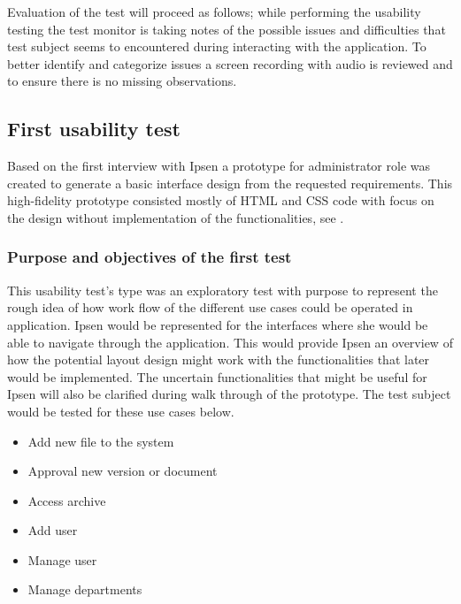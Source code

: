 Evaluation of the test will proceed as follows; while performing the usability testing the test monitor is taking notes of the possible issues and difficulties that test subject seems to encountered during interacting with the application. 
To better identify and categorize issues a screen recording with audio is reviewed and to ensure there is no missing observations.

\subsection{First usability test}\label{firsttest}
Based on the first interview with Ipsen a prototype for administrator role was created to generate a basic interface design from the requested requirements. 
This high-fidelity prototype consisted mostly of HTML and CSS code with focus on the design without implementation of the functionalities, see .

\subsubsection*{Purpose and objectives of the first test}
This usability test's type was an exploratory test with purpose to represent the rough idea of how work flow of the different use cases could be operated in application. 
Ipsen would be represented for the interfaces where she would be able to navigate through the application.
This would provide Ipsen an overview of how the potential layout design might work with the functionalities that later would be implemented. 
The uncertain functionalities that might be useful for Ipsen will also be clarified during walk through of the prototype.
The test subject would be tested for these use cases below.

\begin{itemize}
	\item Add new file to the system
	\item Approval new version or document
	\item Access archive
	\item Add user
	\item Manage user
	\item Manage departments
\end{itemize}

